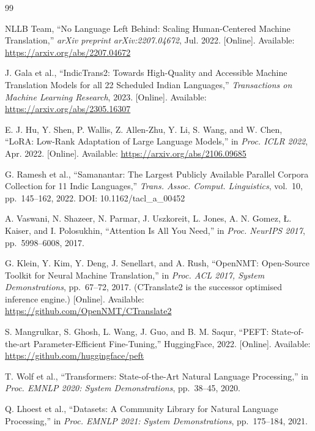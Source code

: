 \documentclass[conference]{IEEEtran}
\begin{document}

\begin{thebibliography}{99}

NLLB Team, ``No Language Left Behind: Scaling Human-Centered Machine Translation,''
\textit{arXiv preprint arXiv:2207.04672}, Jul. 2022.
[Online]. Available: \url{https://arxiv.org/abs/2207.04672}

J. Gala et al., ``IndicTrans2: Towards High-Quality and Accessible Machine Translation
Models for all 22 Scheduled Indian Languages,''
\textit{Transactions on Machine Learning Research}, 2023.
[Online]. Available: \url{https://arxiv.org/abs/2305.16307}

E. J. Hu, Y. Shen, P. Wallis, Z. Allen-Zhu, Y. Li, S. Wang, and W. Chen,
``LoRA: Low-Rank Adaptation of Large Language Models,''
in \textit{Proc. ICLR 2022}, Apr. 2022.
[Online]. Available: \url{https://arxiv.org/abs/2106.09685}

G. Ramesh et al., ``Samanantar: The Largest Publicly Available Parallel Corpora
Collection for 11 Indic Languages,''
\textit{Trans. Assoc. Comput. Linguistics}, vol.~10, pp.~145--162, 2022.
DOI: 10.1162/tacl\_a\_00452

A. Vaswani, N. Shazeer, N. Parmar, J. Uszkoreit, L. Jones, A. N. Gomez,
\L. Kaiser, and I. Polosukhin, ``Attention Is All You Need,''
in \textit{Proc. NeurIPS 2017}, pp.~5998--6008, 2017.

G. Klein, Y. Kim, Y. Deng, J. Senellart, and A. Rush,
``OpenNMT: Open-Source Toolkit for Neural Machine Translation,''
in \textit{Proc. ACL 2017, System Demonstrations}, pp.~67--72, 2017.
(CTranslate2 is the successor optimised inference engine.)
[Online]. Available: \url{https://github.com/OpenNMT/CTranslate2}

S. Mangrulkar, S. Ghosh, L. Wang, J. Guo, and B. M. Saqur,
``PEFT: State-of-the-art Parameter-Efficient Fine-Tuning,''
HuggingFace, 2022.
[Online]. Available: \url{https://github.com/huggingface/peft}

T. Wolf et al., ``Transformers: State-of-the-Art Natural Language Processing,''
in \textit{Proc. EMNLP 2020: System Demonstrations}, pp.~38--45, 2020.

Q. Lhoest et al., ``Datasets: A Community Library for Natural Language Processing,''
in \textit{Proc. EMNLP 2021: System Demonstrations}, pp.~175--184, 2021.


\end{thebibliography}
\end{document}
